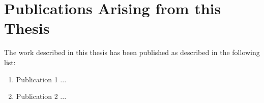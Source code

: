 \cleardoublepage
\chapter*{Publications Arising from this Thesis}
\vspace{-0.5cm}

The work described in this thesis has been published as described in the following list:
\begin{enumerate}
	\item Publication 1 ...

    \item Publication 2 ...
\end{enumerate}

\cleardoublepage
\tableofcontents

\cleardoublepage
\listoffigures

\cleardoublepage
\listoftables

\cleardoublepage

